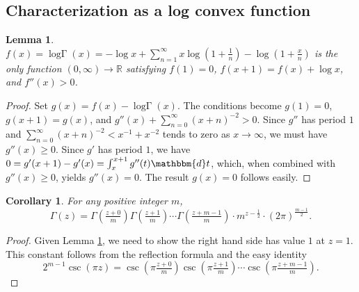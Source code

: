 \documentclass[12pt]{article}
\newcommand{\dd}[0] {\mathbbm{d}}
\newcommand{\logG} {\operatorname {log \Gamma}}
\newcommand{\bbR}[0]  { \mathbb{R}}
\numberwithin{equation}{section}
\newtheorem{lemma}[theorem]{Lemma}
\newtheorem{corollary}[theorem]{Corollary}
\begin{document}
\subsection{Characterization as a log convex function}
\begin{lemma}
\label{lemma_loggamma_char}
$f(x) = \logG (x) = -\log x + \sum_{n=1}^{\infty} x \log(1+\frac{1}{n}) - \log(1+\frac{x}{n})$ is the only function $(0,\infty) \to \bbR$ satisfying $f(1) = 0$, $f(x+1) = f(x) + \log x$, and $f''(x) > 0$.
\end{lemma}
\begin{proof}
Set $g(x) = f(x) - \logG (x)$. The conditions become $g(1) = 0$, $g(x+1) = g(x)$, and $
g''(x) + \sum_{n=0}^{\infty} (x+n)^{-2} > 0$.
Since $g''$ has period $1$ and $\sum_{n=0}^{\infty} (x+n)^{-2} < x^{-1} + x^{-2}$ tends to zero as $x \to \infty$, we must have $g''(x) \ge 0$. Since $g'$ has period $1$, we have $0 = g'(x+1) - g'(x) = \int_{x}^{x+1} g''(t) \dd t$,
which, when combined with $g''(x) \ge 0$, yields $g''(x) = 0$. The result $g(x)=0$ follows easily.
\end{proof}

\begin{corollary}
For any positive integer $m$,
\begin{equation*}
\Gamma(z) = \Gamma(\tfrac{z+0}{m})\Gamma(\tfrac{z+1}{m})\cdots \Gamma(\tfrac{z+m-1}{m}) \cdot m^{z-\frac{1}{2}} \cdot (2\pi)^{\frac{m-1}{2}}\text{.}
\end{equation*}
\end{corollary}
\begin{proof}
Given Lemma \ref{lemma_loggamma_char}, we need to show the right hand side has value $1$ at $z=1$. This constant follows from the reflection formula and the easy identity
\begin{equation*}
2^{m-1} \csc(\pi z) = \csc(\pi \tfrac{z+0}{m})\csc(\pi \tfrac{z+1}{m}) \cdots \csc(\pi \tfrac{z+m-1}{m})\text{.}
\end{equation*}
\end{proof}
\end{document}
